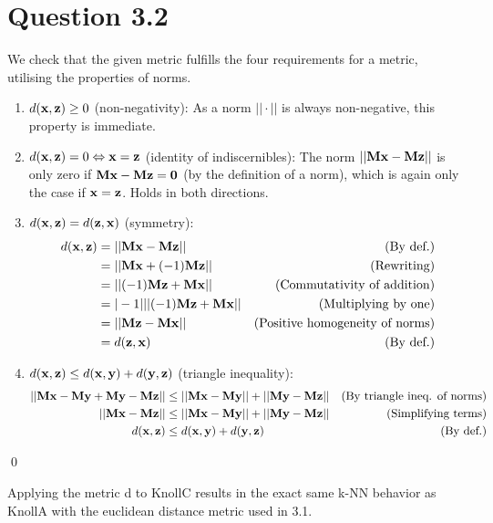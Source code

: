 \section*{Question 3.2}
We check that the given metric fulfills the four requirements for a
metric, utilising the properties of norms.

\begin{enumerate}
\item $d(\bold{x},\bold{z}) \geq 0$ (non-negativity): As a norm
  $||\cdot||$ is always non-negative, this property is immediate.
\item $d(\bold{x},\bold{z}) = 0 \Leftrightarrow \bold{x}=\bold{z}$ (identity of
  indiscernibles): The norm $||\bold{Mx}-\bold{Mz}||$ is only zero if
  $\bold{Mx}-\bold{Mz}=\bold{0}$ (by the definition of a norm), which
  is again only the case if $\bold{x}=\bold{z}$.  Holds in both
  directions.
\item $d(\bold{x},\bold{z}) = d(\bold{z},\bold{x})$ (symmetry):
  \begin{align*}
    d(\bold{x},\bold{z})&=||\bold{Mx}-\bold{Mz}||&\text{(By def.)} \\
    &=||\bold{Mx}+(-1)\bold{Mz}||&\text{(Rewriting)} \\
    &=||(-1)\bold{Mz}+\bold{Mx}||&\text{(Commutativity of addition)} \\
    &=|-1|||(-1)\bold{Mz}+\bold{Mx}||&\text{(Multiplying by one)} \\
    &=||\bold{Mz}-\bold{Mx}||&\text{(Positive homogeneity of norms)} \\
    &=d(\bold{z},\bold{x})&\text{(By def.)}
\end{align*}
\item $d(\bold{x}, \bold{z}) \leq d(\bold{x}, \bold{y}) + d(\bold{y},
  \bold{z})$ (triangle inequality):
  \begin{align*}
    ||\bold{Mx}-\bold{My}+\bold{My}-\bold{Mz}|| &\leq ||\bold{Mx}-\bold{My}|| + ||\bold{My}-\bold{Mz}||&\text{(By triangle ineq. of norms)}\\
    ||\bold{Mx}-\bold{Mz}|| &\leq ||\bold{Mx}-\bold{My}|| + ||\bold{My}-\bold{Mz}||&\text{(Simplifying terms)}\\
    d(\bold{x}, \bold{z}) &\leq d(\bold{x}, \bold{y}) + d(\bold{y}, \bold{z})&\text{(By def.)}
  \end{align*}
\end{enumerate}\qed

Applying the metric d to KnollC results in the exact same k-NN behavior as KnollA with the euclidean distance metric used in 3.1.

